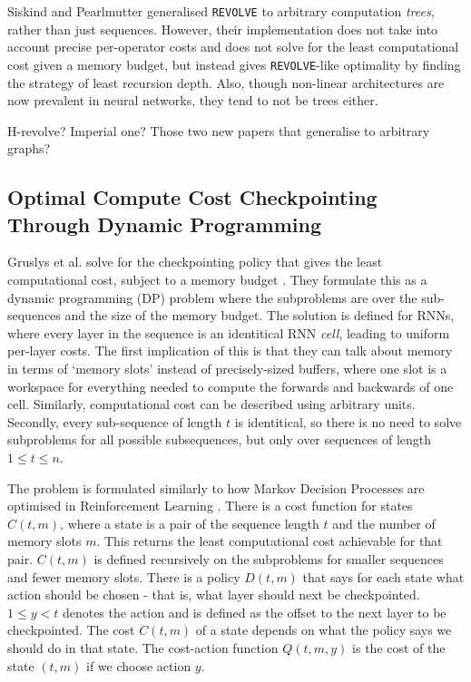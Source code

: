 Siskind and Pearlmutter \cite{Siskind2018} generalised \texttt{REVOLVE} to arbitrary computation \textit{trees}, rather than just sequences.
However, their implementation does not take into account precise per-operator costs and does not solve for the least computational cost given a memory budget, but instead gives \texttt{REVOLVE}-like optimality by finding the strategy of least recursion depth.
Also, though non-linear architectures are now prevalent in neural networks, they tend to not be trees either.

 H-revolve? Imperial one? Those two new papers that generalise to arbitrary graphs?

\subsection{Optimal Compute Cost Checkpointing Through Dynamic Programming} \label{sec:2-5-dp-checkpointing}
Gruslys et al. solve for the checkpointing policy that gives the least computational cost, subject to a memory budget \cite{Gruslys2016}.
They formulate this as a dynamic programming (DP) problem where the subproblems are over the sub-sequences and the size of the memory budget.
The solution is defined for RNNs, where every layer in the sequence is an identitical RNN \textit{cell}, leading to uniform per-layer costs.
The first implication of this is that they can talk about memory in terms of `memory slots' instead of precisely-sized buffers, where one slot is a workspace for everything needed to compute the forwards and backwards of one cell.
Similarly, computational cost can be described using arbitrary units.
Secondly, every sub-sequence of length \(t\) is identitical, so there is no need to solve subproblems for all possible subsequences, but only over sequences of length \(1\leq t\leq n\).

The problem is formulated similarly to how Markov Decision Processes are optimised in Reinforcement Learning \cite{Bellman1954, Sutton1998}.
There is a cost function for states \(C(t, m)\), where a state is a pair of the sequence length \(t\) and the number of memory slots \(m\).
This returns the least computational cost achievable for that pair.
\(C(t, m)\) is defined recursively on the subproblems for smaller sequences and fewer memory slots.
There is a policy \(D(t, m)\) that says for each state what action should be chosen - that is, what layer should next be checkpointed. \(1 \leq y < t\) denotes the action and is defined as the offset to the next layer to be checkpointed.
The cost \(C(t, m)\) of a state depends on what the policy says we should do in that state.
The cost-action function \(Q(t, m, y)\) is the cost of the state \((t, m)\) if we choose action \(y\).

